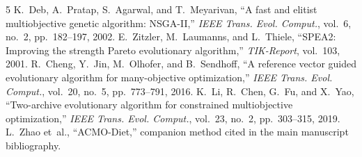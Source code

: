 \documentclass[lettersize,journal,onecolumn]{IEEEtran}
\begin{document}
\begin{thebibliography}{5}
K.~Deb, A.~Pratap, S.~Agarwal, and T.~Meyarivan,
``A fast and elitist multiobjective genetic algorithm: NSGA-II,''
\emph{IEEE Trans. Evol. Comput.}, vol.~6, no.~2, pp.~182--197, 2002.
E.~Zitzler, M.~Laumanns, and L.~Thiele,
``SPEA2: Improving the strength Pareto evolutionary algorithm,''
\emph{TIK-Report}, vol.~103, 2001.
R.~Cheng, Y.~Jin, M.~Olhofer, and B.~Sendhoff,
``A reference vector guided evolutionary algorithm for many-objective optimization,''
\emph{IEEE Trans. Evol. Comput.}, vol.~20, no.~5, pp.~773--791, 2016.
K.~Li, R.~Chen, G.~Fu, and X.~Yao,
``Two-archive evolutionary algorithm for constrained multiobjective optimization,''
\emph{IEEE Trans. Evol. Comput.}, vol.~23, no.~2, pp.~303--315, 2019.
L.~Zhao et~al.,
``ACMO-Diet,'' companion method cited in the main manuscript bibliography.
\end{thebibliography}
\end{document}
